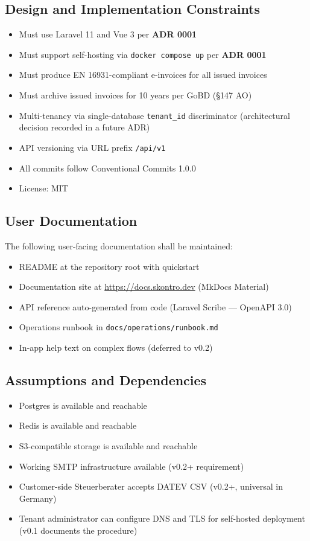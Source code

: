 \documentclass[11pt,a4paper]{article}
\begin{document}
\subsection{Design and Implementation Constraints}

\begin{itemize}
    \item Must use Laravel 11 and Vue 3 per \textbf{ADR 0001}
    \item Must support self-hosting via \texttt{docker compose up} per \textbf{ADR 0001}
    \item Must produce EN 16931-compliant e-invoices for all issued invoices
    \item Must archive issued invoices for 10 years per GoBD (\S147 AO)
    \item Multi-tenancy via single-database \texttt{tenant\_id} discriminator (architectural decision recorded in a future ADR)
    \item API versioning via URL prefix \texttt{/api/v1}
    \item All commits follow Conventional Commits 1.0.0
    \item License: MIT
\end{itemize}

\subsection{User Documentation}

The following user-facing documentation shall be maintained:

\begin{itemize}
    \item README at the repository root with quickstart
    \item Documentation site at \url{https://docs.skontro.dev} (MkDocs Material)
    \item API reference auto-generated from code (Laravel Scribe --- OpenAPI 3.0)
    \item Operations runbook in \texttt{docs/operations/runbook.md}
    \item In-app help text on complex flows (deferred to v0.2)
\end{itemize}

\subsection{Assumptions and Dependencies}

\begin{itemize}
    \item Postgres is available and reachable
    \item Redis is available and reachable
    \item S3-compatible storage is available and reachable
    \item Working SMTP infrastructure available (v0.2+ requirement)
    \item Customer-side Steuerberater accepts DATEV CSV (v0.2+, universal in Germany)
    \item Tenant administrator can configure DNS and TLS for self-hosted deployment (v0.1 documents the procedure)
\end{itemize}
\end{document}
